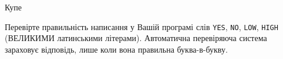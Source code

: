 \begin{problemAllDefault}{Купе}
\Examples
\begin{exampleSimple}{3em}{3em}%
%
\end{exampleSimple}
\begin{exampleSimple}{3em}{3em}%
%
\end{exampleSimple}

\Note
Перевірте правильність написання у Вашій програмі слів \texttt{YES}, \texttt{NO}, \texttt{LOW}, \texttt{HIGH} (ВЕЛИКИМИ латинськими літерами). Автоматична перевіряюча система зараховує відповідь, лише коли вона правильна буква-в-букву.

\end{problemAllDefault}
